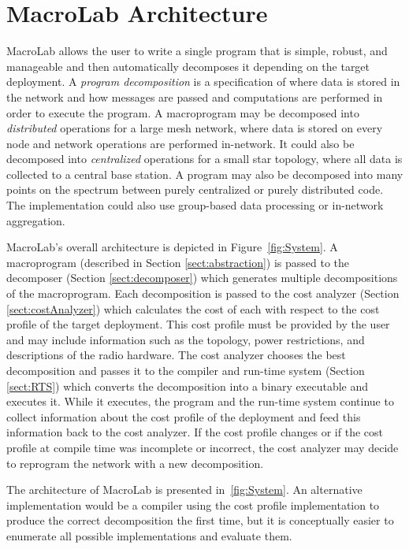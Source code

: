 \section{MacroLab Architecture}

MacroLab allows the user to write a single program that is simple, robust, and
manageable and then automatically decomposes it depending on the target
deployment.  A {\em program decomposition} is a specification of where data is
stored in the network and how messages are passed and computations are performed
in order to execute the program.  A macroprogram may be decomposed into {\em
distributed} operations for a large mesh network, where data is stored on every
node and network operations are performed in-network.  It could also be
decomposed into {\em centralized} operations for a small star topology, where
all data is collected to a central base station.  A program may also be
decomposed into many points on the spectrum between purely centralized or purely
distributed code.  The implementation could also use group-based data processing
or in-network aggregation.

MacroLab's overall architecture is depicted in Figure~\ref{fig:System}.  A
macroprogram (described in Section \ref{sect:abstraction}) is passed to the
decomposer (Section \ref{sect:decomposer}) which generates multiple
decompositions of the macroprogram.  Each decomposition is passed to the cost
analyzer (Section \ref{sect:costAnalyzer}) which calculates the cost of each
with respect to the cost profile of the target deployment. This cost profile
must be provided by the user and may include information such as the topology,
power restrictions, and descriptions of the radio hardware. The cost analyzer
chooses the best decomposition and passes it to the compiler and run-time system
(Section \ref{sect:RTS}) which converts the decomposition into a binary
executable and executes it.  While it executes, the program and the run-time
system continue to collect information about the cost profile of the deployment
and feed this information back to the cost analyzer.  If the cost profile
changes or if the cost profile at compile time was incomplete or incorrect, the
cost analyzer may decide to reprogram the network with a new decomposition.

The architecture of MacroLab is presented in~\ref{fig:System}. An alternative
implementation would be a compiler using the cost profile implementation to
produce the correct decomposition the first time, but it is conceptually easier
to enumerate all possible implementations and evaluate them.


